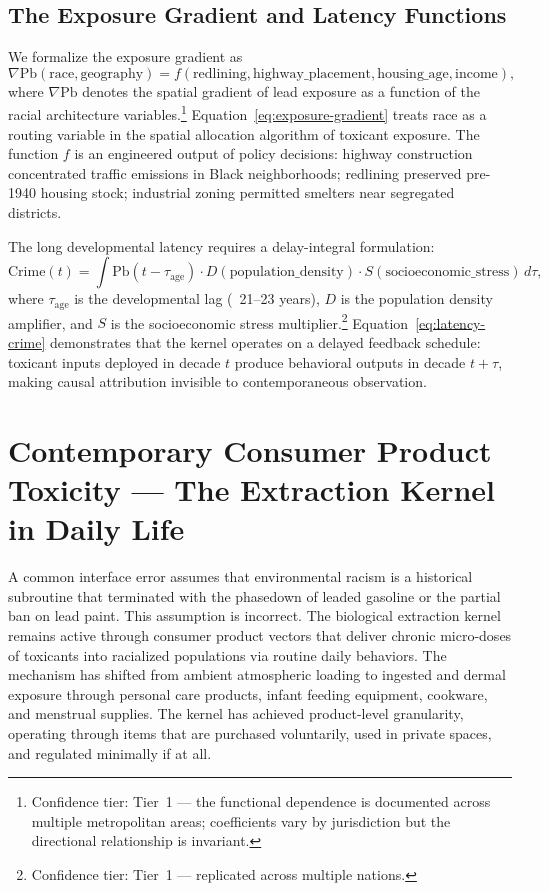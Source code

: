 \subsection{The Exposure Gradient and Latency Functions}

We formalize the exposure gradient as
\begin{equation}
\nabla\mathrm{Pb}(\text{race}, \text{geography}) = f(\text{redlining}, \text{highway\_placement}, \text{housing\_age}, \text{income}),
\label{eq:exposure-gradient}
\end{equation}
where $\nabla\mathrm{Pb}$ denotes the spatial gradient of lead exposure as a
function of the racial architecture variables.\footnote{Confidence tier: Tier~1
--- the functional dependence is documented across multiple metropolitan areas;
coefficients vary by jurisdiction but the directional relationship is invariant.}
Equation~\eqref{eq:exposure-gradient} treats race as a routing variable in the
spatial allocation algorithm of toxicant exposure. The function $f$ is an
engineered output of policy decisions: highway construction concentrated traffic
emissions in Black neighborhoods; redlining preserved pre-1940 housing stock;
industrial zoning permitted smelters near segregated districts.

The long developmental latency requires a delay-integral formulation:
\begin{equation}
\mathrm{Crime}(t) = \int \mathrm{Pb}(t - \tau_{\text{age}}) \cdot D(\text{population\_density}) \cdot S(\text{socioeconomic\_stress}) \, d\tau,
\label{eq:latency-crime}
\end{equation}
where $\tau_{\text{age}}$ is the developmental lag (~21--23 years), $D$ is the
population density amplifier, and $S$ is the socioeconomic stress
multiplier.\footnote{Confidence tier: Tier~1 --- replicated across multiple
nations.} Equation~\eqref{eq:latency-crime} demonstrates that the kernel
operates on a delayed feedback schedule: toxicant inputs deployed in decade $t$
produce behavioral outputs in decade $t + \tau$, making causal attribution
invisible to contemporaneous observation.

\section{Contemporary Consumer Product Toxicity --- The Extraction Kernel in Daily Life}

A common interface error assumes that environmental racism is a historical
subroutine that terminated with the phasedown of leaded gasoline or the partial
ban on lead paint. This assumption is incorrect. The biological extraction kernel
remains active through consumer product vectors that deliver chronic micro-doses
of toxicants into racialized populations via routine daily behaviors. The
mechanism has shifted from ambient atmospheric loading to ingested and dermal
exposure through personal care products, infant feeding equipment, cookware, and
menstrual supplies. The kernel has achieved product-level granularity, operating
through items that are purchased voluntarily, used in private spaces, and
regulated minimally if at all.

